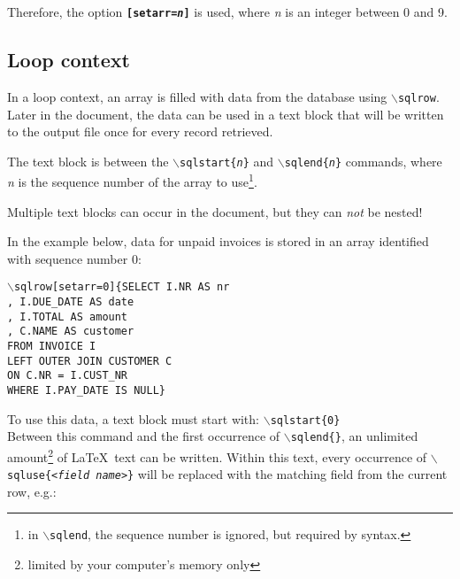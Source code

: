 \documentclass{article}
\newcommand{\bs}{\ensuremath{\backslash}}
\newcommand{\vs}{\vspace{3mm}}
\begin{document}
Therefore, the option \texttt{\textbf{[setarr=\textit{n}]}} is used, where \textit{n} is an integer between
0 and 9.

\subsection{Loop context}\label{loops}

In a loop context, an array is filled with data from the database using \texttt{\bs sqlrow}.\\
Later in the document, the data can be used in a text block that will be written to the output file once for every record retrieved.

\vs

The text block is between the \texttt{\bs sqlstart\{\textit{n}\}} and \texttt{\bs sqlend\{\textit{n}\}} commands, where \textit{n} is the sequence number of the array to use\footnote{ in \texttt{\bs sqlend}, the sequence number is ignored, but required by syntax.}.

Multiple text blocks can occur in the document, but they can \textit{not} be nested!

\vs

In the example below, data for unpaid invoices is stored in an array identified with sequence number 0:
 
\texttt{\bs sqlrow[setarr=0]\{SELECT I.NR AS nr\\
\hspace*{15mm},  I.DUE\_DATE AS date\\
\hspace*{15mm},  I.TOTAL AS amount\\
\hspace*{15mm},  C.NAME AS customer\\
\hspace*{15mm}FROM INVOICE I\\
\hspace*{15mm}LEFT OUTER JOIN CUSTOMER C\\
\hspace*{20mm}ON C.NR = I.CUST\_NR\\
\hspace*{15mm}WHERE I.PAY\_DATE IS NULL\}}

\vs

To use this data, a text block must start with: \texttt{\bs sqlstart\{0\}}\\
Between this command and the first occurrence of \texttt{\bs sqlend\{\}}, an unlimited amount\footnote{ limited by your computer's memory only} of \LaTeX\ text can be written. Within this text, every occurrence of \texttt{\bs sqluse\{<\textit{field name}>\}} will be replaced with the matching field from the current row, e.g.:
\end{document}
